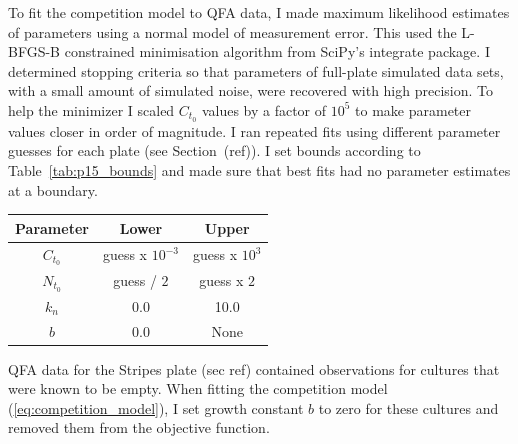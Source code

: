 To fit the competition model to QFA data, I made maximum likelihood
estimates of parameters using a normal model of measurement
error. This used the L-BFGS-B constrained minimisation algorithm from
SciPy's integrate package. I determined stopping criteria so that
parameters of full-plate simulated data sets, with a small amount of
simulated noise, were recovered with high precision. To help the
minimizer I scaled \(C_{t_{0}}\) values by a factor of \(10^{5}\) to
make parameter values closer in order of magnitude. I ran repeated
fits using different parameter guesses for each plate (see
Section~(ref)). I set bounds according to Table~\ref{tab:p15_bounds}
and made sure that best fits had no parameter estimates at a boundary.
%
\columnbreak
\begin{center}
  \begin{tabular}{| c | c c |}
    \hline
    Parameter        & Lower   & Upper \\
    \hline
    \(C_{t_{0}}\)     & guess x \(10^{-3}\)  & guess x \(10^{3}\)\\
    \(N_{t_{0}}\)     & guess / \(2\)  & guess x \(2\)\\
    \(k_{n}\)        & 0.0    & 10.0\\
    \(b\)           & 0.0    & None \\
    \hline
  \end{tabular}
  \label{tab:p15_bounds}
\end{center}
%





QFA data for the Stripes plate (sec ref) contained observations for
cultures that were known to be empty. When fitting the competition
model (\ref{eq:competition_model}), I set growth constant \(b\) to
zero for these cultures and removed them from the objective function.


